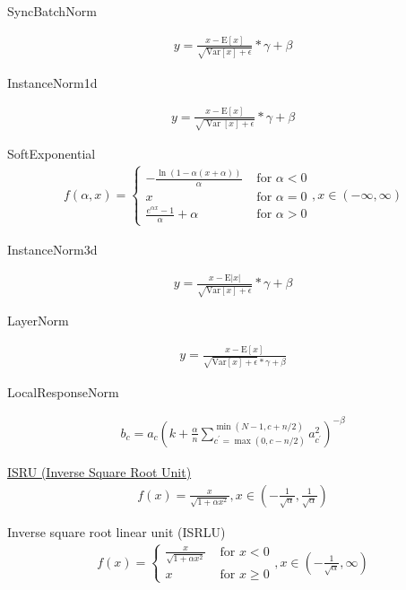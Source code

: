SyncBatchNorm

\begin{align}
  y=\frac{x-\mathrm{E}[x]}{\sqrt{\mathrm{Var}[x]+\epsilon}} * \gamma+\beta
\end{align}

InstanceNorm1d

\begin{align}
  y=\frac{x-\mathrm{E}[x]}{\sqrt{\operatorname{Var}[x]+\epsilon}} * \gamma+\beta
\end{align}

SoftExponential
\begin{align}
  f(\alpha, x)=\left\{\begin{array}{ll}
{-\frac{\ln (1-\alpha(x+\alpha))}{\alpha}} & {\text { for } \alpha<0} \\
{x} & {\text { for } \alpha=0} \\
{\frac{e^{\alpha x}-1}{\alpha}+\alpha} & {\text { for } \alpha>0}
\end{array}\right., x\in (-\infty, \infty)
\end{align}

InstanceNorm3d

\begin{align}
  y=\frac{x-\mathrm{E}|x|}{\sqrt{\mathrm{Var}[x]+\epsilon}} * \gamma+\beta
\end{align}

LayerNorm

\begin{align}
  y=\frac{x-\mathrm{E}[x]}{\sqrt{\mathrm{Var}[x]+\epsilon} * \gamma+\beta}
\end{align}

LocalResponseNorm

\begin{align}
  b_{c}=a_{c}\left(k+\frac{\alpha}{n} \sum_{c^{\prime}=\max (0, c-n / 2)}^{\min (N-1, c+n / 2)} a_{c^{\prime}}^{2}\right)^{-\beta}
\end{align}

\href{http://www.gabormelli.com/RKB/Inverse_Square_Root_Unit_(ISRU)_Activation_Function}{ISRU (Inverse Square Root Unit)} \cite{BradCarlile2017}
\begin{align}
  f(x)=\frac{x}{\sqrt{1+\alpha x^{2}}}, x\in \left(-\frac{1}{\sqrt{\alpha}}, \frac{1}{\sqrt{\alpha}}\right)
\end{align}

Inverse square root linear unit (ISRLU) \cite{BradCarlile2017}
\begin{align}
f(x)=\left\{\begin{array}{ll}
{\frac{x}{\sqrt{1+\alpha x^{2}}}} & {\text { for } x<0} \\
{x} & {\text { for } x \geq 0}
\end{array}\right., x\in \left(-\frac{1}{\sqrt{\alpha}}, \infty\right)
\end{align}

